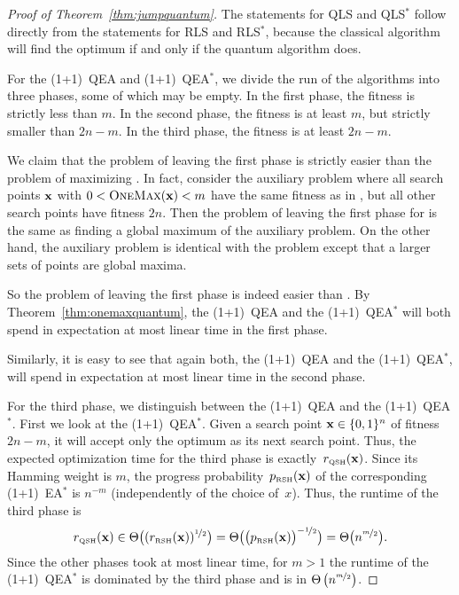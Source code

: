 \documentclass[a4paper,11pt]{article}
\begin{document}
\begin{proof}[Proof of Theorem~\ref{thm:jumpquantum}]
The statements for QLS and QLS$^*$ follow directly from the statements for RLS and RLS$^*$, because the classical algorithm will find the optimum if and only if the quantum algorithm does.

For the (1+1)~QEA and (1+1)~QEA$^*$, we divide the run of the algorithms into three phases, some of which may be empty. In the first phase, the fitness is strictly less than $m$. In the second phase, the fitness is at least $m$, but strictly smaller than $2n-m$. In the third phase, the fitness is at least $2n-m$. 

We claim that the problem of leaving the first phase is strictly easier than the problem of maximizing \onemax. In fact, consider the auxiliary problem where all search points $\xvec$ with $0 < \onemax(\xvec) < m$ have the same fitness as in \jump, but all other search points have fitness $2n$. Then the problem of leaving the first phase for \jumpm is the same as finding a global maximum of the auxiliary problem. On the other hand, the auxiliary problem is identical with the problem \onemax except that a larger sets of points are global maxima.

So the problem of leaving the first phase is indeed easier than \onemax. By Theorem~\ref{thm:onemaxquantum}, the (1+1)~QEA and the (1+1)~QEA$^*$ will both spend in expectation at most linear time in the first phase.

Similarly, it is easy to see that again both, the (1+1)~QEA and the (1+1)~QEA$^*$, will spend in expectation at most linear time in the second phase.

For the third phase, we distinguish between the (1+1)~QEA and the (1+1)~QEA$^*$. First we look at the (1+1)~QEA$^*$. Given a search point $\xvec\in\{0,1\}^n$ of fitness $2n-m$, it will accept only the optimum as its next search point. Thus, the expected optimization time for the third phase is exactly~$r_\QSH(\xvec)$. Since its Hamming weight is $m$, the progress probability~$p_\RSH(\xvec)$ of the corresponding (1+1)~EA$^*$ is $n^{-m}$ (independently of the choice of~$x$). Thus, the runtime of the third phase is
\[
r_\QSH(\xvec)\in\Theta\big((r_\RSH(\xvec))^{\nicefrac{1}{2}}\big)=\Theta\big(\big(p_\RSH(\xvec)\big)^{-\nicefrac{1}{2}}\big)=\Theta\big(n^{\nicefrac{m}{2}}\big).
\]
Since the other phases took at most linear time, for $m>1$ the runtime of the (1+1)~QEA$^*$ is dominated by the third phase and is in $\Theta\left(n^{\nicefrac{m}{2}}\right)$.


\end{proof}
\end{document}
